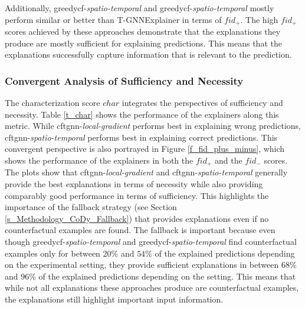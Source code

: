 Additionally, \gls{greedycf}-\textit{spatio-temporal} and \gls{greedycf}-\textit{spatio-temporal} mostly perform similar or better than T-GNNExplainer in terms of $fid_+$. The high $fid_+$ scores achieved by these approaches demonstrate that the explanations they produce are mostly sufficient for explaining predictions. This means that the explanations successfully capture information that is relevant to the prediction.



\FloatBarrier
\subsubsection{Convergent Analysis of Sufficiency and Necessity}
\label{s_Evaluation_Results_ConvergentAnalysis}

The characterization score $char$ integrates the perspectives of sufficiency and necessity. Table \ref{t_char} shows the performance of the explainers along this metric. While \gls{cftgnn}-\textit{local-gradient} performs best in explaining wrong predictions, \gls{cftgnn}-\textit{spatio-temporal} performs best in explaining correct predictions. This convergent perspective is also portrayed in Figure \ref{f_fid_plus_minus}, which shows the performance of the explainers in both the $fid_+$ and the $fid_-$ scores. The plots show that \gls{cftgnn}-\textit{local-gradient} and \gls{cftgnn}-\textit{spatio-temporal} generally provide the best explanations in terms of necessity while also providing comparably good performance in terms of sufficiency. This highlights the importance of the fallback strategy (see Section \ref{s_Methodology_CoDy_Fallback}) that provides explanations even if no counterfactual examples are found. The fallback is important because even though \gls{greedycf}-\textit{spatio-temporal} and \gls{greedycf}-\textit{spatio-temporal} find counterfactual examples only for between $20\%$ and $54\%$ of the explained predictions depending on the experimental setting, they provide sufficient explanations in between $68\%$ and $96\%$ of the explained predictions depending on the setting. This means that while not all explanations these approaches produce are counterfactual examples, the explanations still highlight important input information.


